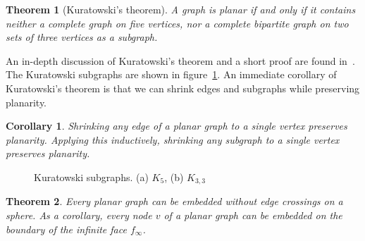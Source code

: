 \documentclass[11pt]{article}
\newtheorem{theorem}{Theorem}[section]
\newtheorem{corollary}{Corollary}[theorem]
\begin{document}
\begin{theorem}[Kuratowski's theorem]
  A graph is planar if and only if it contains neither a complete graph on five vertices, nor a complete bipartite graph on two sets of three vertices as a subgraph.
\end{theorem}

An in-depth discussion of Kuratowski's theorem and a short proof are found in~\cite{thomassen1981kuratowski}. The Kuratowski subgraphs are shown in figure~\ref{fig:kuratowski}. An immediate corollary of Kuratowski's theorem is that we can shrink edges and subgraphs while preserving planarity.\\

\begin{corollary}
  Shrinking any edge of a planar graph to a single vertex preserves planarity. Applying this inductively, shrinking any subgraph to a single vertex preserves planarity.\\
\end{corollary}

\begin{figure}[!htb]
  \centering
  \hfil
  \caption{Kuratowski subgraphs. (a) $K_5$, (b) $K_{3,3}$}
  \label{fig:kuratowski}
\end{figure}


\begin{theorem}
  Every planar graph can be embedded without edge crossings on a sphere. As a corollary, every node $v$ of a planar graph can be embedded on the boundary of the infinite face $f_{\infty}$.
\end{theorem}
\end{document}
